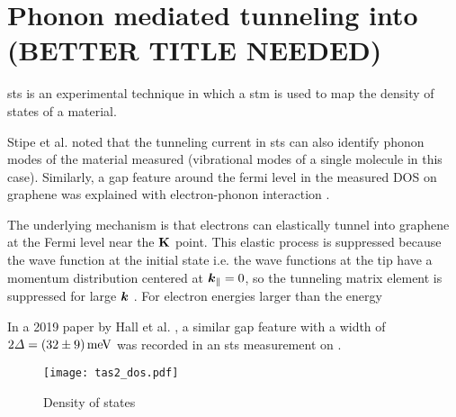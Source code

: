 \documentclass[main.tex]{subfiles}
\begin{document}
\chapter{Phonon mediated tunneling into \TaS (BETTER TITLE NEEDED)}\label{ch:sts_gap_tas2}


\acrfull{sts} is an experimental technique in which a \acrfull{stm} is used to map the density of states of a material.


Stipe et al. noted that the tunneling current in \acrshort{sts} can also identify phonon modes of the material measured \cite{stipe_single-molecule_1998} (vibrational modes of a single molecule in this case).
Similarly, a gap feature around the fermi level in the measured DOS on graphene \cite{zhang_giant_2008} was explained with electron-phonon interaction \cite{wehling_phonon-mediated_2008}.

The underlying mechanism is that electrons can elastically tunnel into graphene at the Fermi level near the \(\vb{K}\) point. 
This elastic process is suppressed because the wave function at the initial state i.e. the wave functions at the tip have a momentum distribution centered at \(\vb*{k}_{\parallel} = 0\), so the tunneling matrix element is suppressed for large \(\vb*{k}\) \cite{vitali_phonon_2004}.
For electron energies larger than the energy 

In a 2019 paper by Hall et al. \cite{hall_environmental_2019}, a similar gap feature with a width of \(2 \Delta = \SI[separate-uncertainty = true]{32 \pm 9}{\milli\eV}\) was recorded in an \acrshort{sts} measurement on \TaS.


\begin{figure}
    \centering
    \texttt{[image: tas2\_dos.pdf]}
    \caption{Density of states}
\end{figure}
\end{document}

